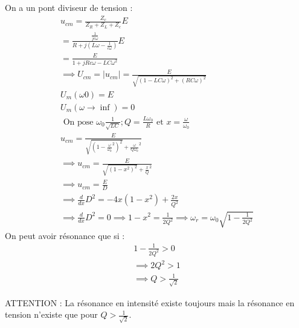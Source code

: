 On a un pont diviseur de tension : 
\begin{eqnarray*}
    u_{cm} = \frac{Z_{c}}{Z_{R} + Z_{L} + Z_{c}}E \\
    = \frac{\frac{1}{jc \omega }}{R + j (L \omega -\frac{1}{c \omega })} E \\
    = \frac{E}{1 + jRc \omega  -LC \omega^{2}} \\
    \implies U_{cm} = \lvert u_{cm} \rvert = \frac{E}{\sqrt{(1-LC \omega)^{2} + (RC \omega )^{2}}} \\
    U_{m}( \omega0) = E \\
    U_{m} ( \omega \to \inf ) = 0 \\
    \text{ On pose } \omega_{0} \frac{1}{\sqrt{LC}} ; Q = \frac{L \omega_{0}}{R} \text{ et } x = \frac{\omega }{\omega _{0}} \\
    u_{cm} = \frac{E}{\sqrt{(1- \frac{\omega }{\omega _{0}}^{2})^{2}} + \frac{\omega }{Q \omega _{0}}^{2}} \\
    \implies u_{cm} = \frac{E}{\sqrt{(1-x^{2})^{2}}+ \frac{x}{Q}^{2}} \\
    \implies u_{cm} = \frac{E}{D} \\
    \implies \frac{d}{dx}D^{2} = -4x (1-x^{2}) + \frac{2x}{Q^{2}}\\
    \implies \frac{d}{dx}D^{2} = 0 \implies 1-x^{2} = \frac{1}{2Q^{2}} \implies \omega_{r} = \omega_{0} \sqrt{1-\frac{1}{2Q^{2}}}
\end{eqnarray*}
On peut avoir résonance que si : 
\begin{eqnarray*}
    1-\frac{1}{2Q^{2}} >0 \\
    \implies 2Q^{2} >1 \\
    \implies Q > \frac{1}{\sqrt{2}}
\end{eqnarray*}

\begin{remark}
    ATTENTION : La résonance en intensité existe toujours mais la résonance en tension n'existe que pour \(Q > \frac{1}{\sqrt{2}}\).  
\end{remark}

